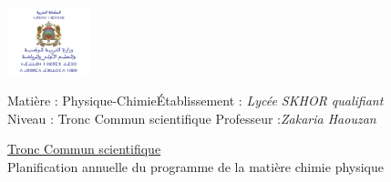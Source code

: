 \documentclass[12pt]{article}
\newcommand\headerMe[2]{\noindent{}#1\hfill#2}
\begin{document}
\begin{center}
\includegraphics[width = 0.18\textwidth]{./img/logoMin.png}
\vspace{-3cm}
\end{center}
\headerMe{Matière : Physique-Chimie}{Établissement : \emph{Lycée SKHOR qualifiant}}\\
\headerMe{ Niveau : Tronc Commun scientifique }{  Professeur :\emph{Zakaria Haouzan}}\\

\begin{center}
	\vspace{0.5cm}
\underline{Tronc Commun scientifique }\\
\hrulefill
\Large{Planification annuelle
du programme de la matière chimie physique}
\hrulefill\\
\end{center}
\end{document}
